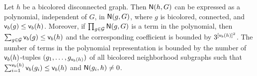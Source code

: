

\begin{lemma} \label{lmm:nbhd}
Let $ h $ be a bicolored disconnected graph. Then $ {\mathsf{N}}(h, G) $ can be expressed as a polynomial, independent of $ G $, in $ {\mathsf{N}}(g, G) $, where $ g $ is bicolored, connected, and $ {\mathsf{v}}_b(g) \leq {\mathsf{v}}_b(h) $. Moreover, if $ \prod_{g\in{\mathcal{G}}}{\mathsf{N}}(g, G)  $ is a term in the polynomial, then $ \sum_{g\in{\mathcal{G}}}{\mathsf{v}}_b(g) \leq {\mathsf{v}}_b(h) $ and the corresponding coefficient is bounded by $ 3^{[{\mathsf{v}}_b(h)]^2} $. The number of terms in the polynomial representation is bounded by the number of $ {\mathsf{v}}_b(h) $-tuples $ (g_1, \dots, g_{{\mathsf{v}}_b(h)}) $ of all bicolored neighborhood subgraphs such that $ \sum_{i=1}^{{\mathsf{v}}_b(h)} {\mathsf{v}}_b(g_i) \leq {\mathsf{v}}_b(h) $ and $ {\mathsf{N}}(g_i, h) \neq 0 $.
\end{lemma}

